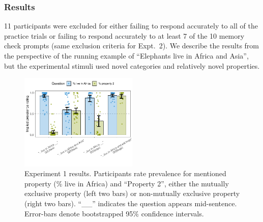 \documentclass[10pt,letterpaper]{article}
\newcommand{\mh}[1]{{\textcolor{Blue}{[mh: #1]}}}
\begin{document}




\subsubsection{Results}





11 participants were excluded for either failing to respond accurately to all of the practice trials or  failing to respond accurately to at least 7 of the 10 memory check prompts (same exclusion criteria for Expt.~2).
We describe the results from the perspective of the running example of ``Elephants live in Africa and Asia'', but the experimental stimuli used novel categories and relatively novel properties.
 
 \begin{figure}[h]
  \centering
    \includegraphics[width=0.5\textwidth]{expt2_summary}
    \vspace{-1cm}
  \caption{Experiment 1 results.  Participants rate prevalence for mentioned property (\% live in Africa) and ``Property 2'', either the mutually exclusive property (left two bars) or non-mutually exclusive property (right two bars). ``\_\_'' indicates the question appears mid-sentence. Error-bars denote bootstrapped 95\% confidence intervals.}
  \label{fig:expt2}
          \vspace{-0.5cm}
  \end{figure}
 
\end{document}
